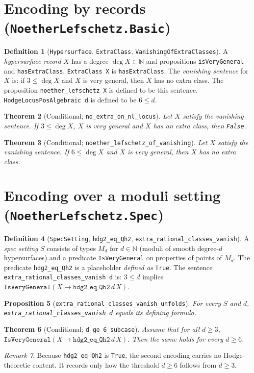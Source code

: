 \documentclass[11pt]{amsart}
\newtheorem{theorem}{Theorem}[section]
\newtheorem{proposition}[theorem]{Proposition}
\theoremstyle{definition}
\newtheorem{definition}[theorem]{Definition}
\theoremstyle{remark}
\newtheorem{remark}[theorem]{Remark}
\begin{document}
\section{Encoding by records (\texttt{NoetherLefschetz.Basic})}
\begin{definition}[\texttt{Hypersurface}, \texttt{ExtraClass}, \texttt{VanishingOfExtraClasses}]
A \emph{hypersurface record} $X$ has a degree $\deg X\in\mathbb N$ and propositions \texttt{isVeryGeneral} and \texttt{hasExtraClass}. \texttt{ExtraClass X} is \texttt{hasExtraClass}. The \emph{vanishing sentence} for $X$ is: if $3\le\deg X$ and $X$ is very general, then $X$ has no extra class. The proposition \texttt{noether\_lefschetz X} is defined to be this sentence. \texttt{HodgeLocusPosAlgebraic d} is defined to be $6\le d$.
\end{definition}
\begin{theorem}[Conditional; \texttt{no\_extra\_on\_nl\_locus}]
Let $X$ satisfy the vanishing sentence. If $3\le\deg X$, $X$ is very general and $X$ has an extra class, then \texttt{False}.
\end{theorem}
\begin{theorem}[Conditional; \texttt{noether\_lefschetz\_of\_vanishing}]
Let $X$ satisfy the vanishing sentence. If $6\le\deg X$ and $X$ is very general, then $X$ has no extra class.
\end{theorem}

\section{Encoding over a moduli setting (\texttt{NoetherLefschetz.Spec})}
\begin{definition}[\texttt{SpecSetting}, \texttt{hdg2\_eq\_Qh2}, \texttt{extra\_rational\_classes\_vanish}]
A \emph{spec setting} $S$ consists of types $M_d$ for $d\in\mathbb N$ (moduli of smooth degree-$d$ hypersurfaces) and a predicate \texttt{IsVeryGeneral} on properties of points of $M_d$. The predicate \texttt{hdg2\_eq\_Qh2} is a placeholder \emph{defined as} \texttt{True}. The sentence \texttt{extra\_rational\_classes\_vanish d} is: $3\le d$ implies $\texttt{IsVeryGeneral}(X\mapsto\texttt{hdg2\_eq\_Qh2}\,d\,X)$.
\end{definition}
\begin{proposition}[\texttt{extra\_rational\_classes\_vanish\_unfolds}]
For every $S$ and $d$, \texttt{extra\_rational\_classes\_vanish d} equals its defining formula.
\end{proposition}
\begin{theorem}[Conditional; \texttt{d\_ge\_6\_subcase}]
Assume that for all $d\ge3$, $\texttt{IsVeryGeneral}(X\mapsto\texttt{hdg2\_eq\_Qh2}\,d\,X)$. Then the same holds for every $d\ge6$.
\end{theorem}
\begin{remark}
Because \texttt{hdg2\_eq\_Qh2} is \texttt{True}, the second encoding carries no Hodge-theoretic content. It records only how the threshold $d\ge6$ follows from $d\ge3$.
\end{remark}
\end{document}

